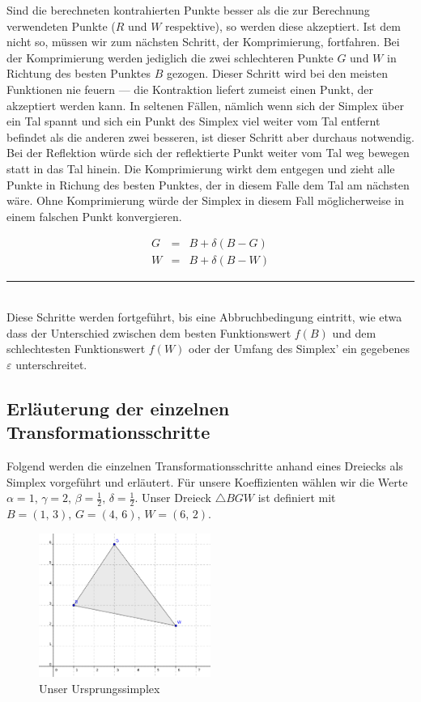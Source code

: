 \documentclass[naustrian]{article}
\begin{document}
Sind die berechneten kontrahierten Punkte besser als die zur Berechnung
verwendeten Punkte ($R$ und $W$ respektive), so werden diese akzeptiert.  Ist
dem nicht so, müssen wir zum nächsten Schritt, der Komprimierung, fortfahren.
Bei der Komprimierung werden jediglich die zwei schlechteren Punkte $G$ und $W$
in Richtung des besten Punktes $B$ gezogen. \cite{nelder-mead-scholarpedia}
Dieser Schritt wird bei den meisten Funktionen nie feuern --- die Kontraktion
liefert zumeist einen Punkt, der akzeptiert werden kann. In seltenen Fällen,
nämlich wenn sich der Simplex über ein Tal spannt und sich ein Punkt des
Simplex viel weiter vom Tal entfernt befindet als die anderen zwei besseren,
ist dieser Schritt aber durchaus notwendig.
Bei der Reflektion würde sich der reflektierte Punkt weiter vom Tal weg bewegen
statt in das Tal hinein. Die Komprimierung wirkt dem entgegen und zieht alle
Punkte in Richung des besten Punktes, der in diesem Falle dem Tal am nächsten
wäre. Ohne Komprimierung würde der Simplex in diesem Fall möglicherweise in
einem falschen Punkt konvergieren.

\begin{eqnarray*}
    G & = & B+\delta(B-G)\\
    W & = & B+\delta(B-W)
\end{eqnarray*}
\rule[0.5ex]{1\columnwidth}{0.5pt}\\

Diese Schritte werden fortgeführt, bis eine Abbruchbedingung eintritt, wie etwa
dass der Unterschied zwischen dem besten Funktionswert $f(B)$ und dem
schlechtesten Funktionswert $f(W)$ oder der Umfang des Simplex' ein gegebenes
$\varepsilon$ unterschreitet.

\subsection{Erläuterung der einzelnen Transformationsschritte}

Folgend werden die einzelnen Transformationsschritte anhand eines
Dreiecks als Simplex vorgeführt und erläutert. Für unsere Koeffizienten
wählen wir die Werte $\alpha=1,\,\gamma=2,\,\beta=\frac{1}{2},\,\delta=\frac{1}{2}$.
Unser Dreieck $\triangle BGW$ ist definiert mit $B=(1,\,3),\,G=(4,\,6),\,W=(6,\,2)$.

\begin{figure}[h]
    \centering
    \includegraphics[width=0.5\textwidth]{nelder_mead/triangle_bgw}
    \caption{Unser Ursprungssimplex}
\end{figure}
\end{document}
